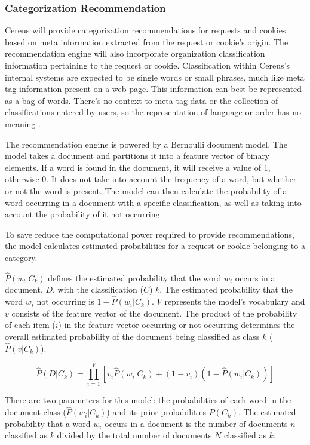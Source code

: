 \subsubsection*{Categorization Recommendation}

Cereus will provide categorization recommendations for requests and cookies based on meta information extracted from the request or cookie's origin. The recommendation engine will also incorporate organization classification information pertaining to the request or cookie. Classification within Cereus's internal systems are expected to be single words or small phrases, much like meta tag information present on a web page. This information can best be represented as a bag of words. There's no context to meta tag data or the collection of classifications entered by users, so the representation of language or order has no meaning \cite{manning.2008}.

The recommendation engine is powered by a Bernoulli document model. The model takes a document and partitions it into a feature vector of binary elements. If a word is found in the document, it will receive a value of 1, otherwise 0. It does not take into account the frequency of a word, but whether or not the word is present. The model can then calculate the probability of a word occurring in a document with a specific classification, as well as taking into account the probability of it not occurring.

To save reduce the computational power required to provide recommendations, the model calculates estimated probabilities for a request or cookie belonging to a category.

\(\hat{P}(w_{t}|C_{k})\) defines the estimated probability that the word \(w_{i}\) occurs in a document, \(D\), with the classification (\(C\)) \(k\). The estimated probability that the word \(w_{i}\) not occurring is \(1 - \hat{P}(w_{i}|C_{k})\). \(V\) represents the model's vocabulary and \(v\) consists of the feature vector of the document. The product of the probability of each item (\(i\)) in the feature vector occurring or not occurring determines the overall estimated probability of the document being classified as class \(k\) (\(\hat{P}(v|C_{k})\)).

\[
  \hat{P}(D|C_{k}) = \prod_{i=1}^{V}[v_{i}\hat{P}(w_{i}|C_{k}) + (1 - v_{i})(1 - \hat{P}(w_{i}|C_{k}))]
\]

There are two parameters for this model: the probabilities of each word in the document class (\(\hat{P}(w_{i}|C_{k})\)) and its prior probabilities \(P(C_{k})\). The estimated probability that a word \(w_{i}\) occurs in a document is the number of documents \(n\) classified as \(k\) divided by the total number of documents \(N\) classified as \(k\).

